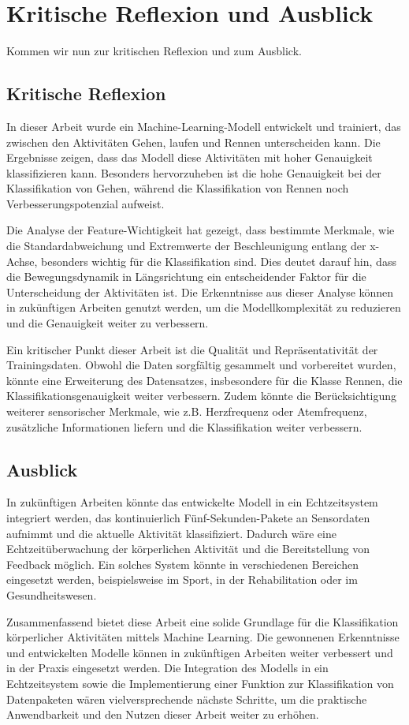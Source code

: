 \chapter{Kritische Reflexion und Ausblick}
Kommen wir nun zur kritischen Reflexion und zum Ausblick.

\section{Kritische Reflexion}
In dieser Arbeit wurde ein Machine-Learning-Modell entwickelt und trainiert, das zwischen den Aktivitäten Gehen, laufen und Rennen unterscheiden kann. Die Ergebnisse zeigen, dass das Modell diese Aktivitäten mit hoher Genauigkeit klassifizieren kann. Besonders hervorzuheben ist die hohe Genauigkeit bei der Klassifikation von Gehen, während die Klassifikation von Rennen noch Verbesserungspotenzial aufweist.

Die Analyse der Feature-Wichtigkeit hat gezeigt, dass bestimmte Merkmale, wie die Standardabweichung und Extremwerte der Beschleunigung entlang der x-Achse, besonders wichtig für die Klassifikation sind. Dies deutet darauf hin, dass die Bewegungsdynamik in Längsrichtung ein entscheidender Faktor für die Unterscheidung der Aktivitäten ist. Die Erkenntnisse aus dieser Analyse können in zukünftigen Arbeiten genutzt werden, um die Modellkomplexität zu reduzieren und die Genauigkeit weiter zu verbessern.

Ein kritischer Punkt dieser Arbeit ist die Qualität und Repräsentativität der Trainingsdaten. Obwohl die Daten sorgfältig gesammelt und vorbereitet wurden, könnte eine Erweiterung des Datensatzes, insbesondere für die Klasse Rennen, die Klassifikationsgenauigkeit weiter verbessern. Zudem könnte die Berücksichtigung weiterer sensorischer Merkmale, wie z.B. Herzfrequenz oder Atemfrequenz, zusätzliche Informationen liefern und die Klassifikation weiter verbessern.

\section{Ausblick}
In zukünftigen Arbeiten könnte das entwickelte Modell in ein Echtzeitsystem integriert werden, das kontinuierlich Fünf-Sekunden-Pakete an Sensordaten aufnimmt und die aktuelle Aktivität klassifiziert. Dadurch wäre eine Echtzeitüberwachung der körperlichen Aktivität und die Bereitstellung von Feedback möglich. Ein solches System könnte in verschiedenen Bereichen eingesetzt werden, beispielsweise im Sport, in der Rehabilitation oder im Gesundheitswesen.

Zusammenfassend bietet diese Arbeit eine solide Grundlage für die Klassifikation körperlicher Aktivitäten mittels Machine Learning. Die gewonnenen Erkenntnisse und entwickelten Modelle können in zukünftigen Arbeiten weiter verbessert und in der Praxis eingesetzt werden. Die Integration des Modells in ein Echtzeitsystem sowie die Implementierung einer Funktion zur Klassifikation von Datenpaketen wären vielversprechende nächste Schritte, um die praktische Anwendbarkeit und den Nutzen dieser Arbeit weiter zu erhöhen.
